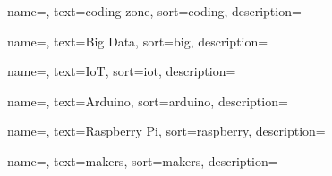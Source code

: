 {
	name=,
    text=coding zone,
    sort=coding,
    description={}
}

{
	name=,
    text=Big Data,
    sort=big,
    description={}
}

{
	name=,
    text=IoT,
    sort=iot,
    description={}
}

{
	name=,
    text=Arduino,
    sort=arduino,
    description={}
}

{
	name=,
    text=Raspberry Pi,
    sort=raspberry,
    description={}
}

{
	name=,
    text=makers,
    sort=makers,
    description={}
}


